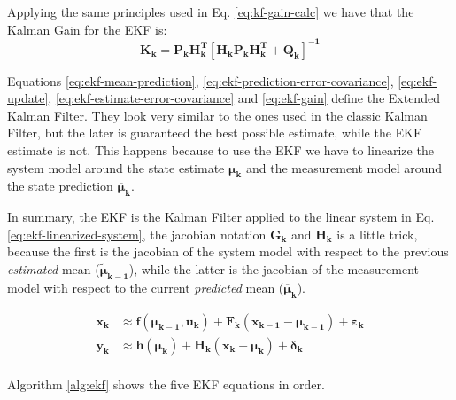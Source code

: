 \documentclass[12pt]{article}
\newcommand{\bvec}[1]{\boldsymbol{\mathbf{#1}}} %
\newcommand{\mat}[1]{\boldsymbol{\mathbf{#1}}}
\newcommand{\brac}[1]{\left[#1\right]} %
\newcommand{\mb}[1]{{\boldsymbol{#1}}} %
\begin{document}
Applying the same principles used in Eq. \ref{eq:kf-gain-calc} we
have that the Kalman Gain for the EKF is:
\begin{equation}
    \mat{K_k} = \mat{\overline{P}_k H_k^T}\brac{\mat{H_k 
    \overline{P}_k H_k^T + Q_k}}^\mathbf{-1}
    \label{eq:ekf-gain}
\end{equation}

Equations \ref{eq:ekf-mean-prediction}, 
\ref{eq:ekf-prediction-error-covariance}, \ref{eq:ekf-update},
\ref{eq:ekf-estimate-error-covariance} and \ref{eq:ekf-gain}
define the Extended Kalman Filter. They look very similar to the ones
used in the classic Kalman Filter, but the later is guaranteed
the best possible estimate, while the EKF estimate is not. This happens
because to use the EKF we have to linearize the system model around the state 
estimate $\bvec{\mu_k}$ and  the measurement model around the state prediction 
$\bvec{\overline{\mu}_k}$. 

In summary, the EKF is the Kalman Filter applied to the linear system in 
Eq. \ref{eq:ekf-linearized-system}, the jacobian notation $\mat{G_k}$ and 
$\mat{H_k}$ is a little trick, because the first is the jacobian of the 
system model with respect to the previous \emph{estimated} mean 
($\mb{\tilde\mu}_\mathbf{k-1}$), while the latter is the jacobian 
of the measurement model with respect to the current \emph{predicted} 
mean ($\bvec{\overline{\mu}_k}$).

\begin{equation}
    \begin{aligned}
        \bvec{x_k} &\approx \mb{f}(\mb{\mu}_\mathbf{k-1}, \bvec{u_k}) + 
        \mat{F_k} (\bvec{x_{k-1}} - \mb{\mu}_\mathbf{k-1}) + 
        \mb{\varepsilon}_\mathbf{k}\\
        \bvec{y_k} &\approx \mb{h}(\bar{\mb{\mu}}_\mathbf{k}) + \mat{H_k} 
        (\bvec{x_k} - \mb{\overline{\mu}}_\mathbf{k}) + \mb{\delta}_\mathbf{k}\\
    \end{aligned}
    \label{eq:ekf-linearized-system}
\end{equation}

Algorithm \ref{alg:ekf} shows the five EKF equations in order.
\end{document}
